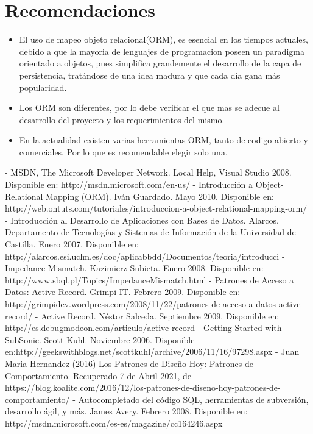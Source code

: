 \documentclass[twoside,twocolumn]{article}
\begin{document}
\section{Recomendaciones}
 \begin{itemize}
\item El uso de mapeo objeto relacional(ORM), es esencial en los tiempos actuales, debido a que la mayoria de lenguajes de programacion poseen un paradigma orientado a objetos, pues simplifica grandemente el
desarrollo de la capa de persistencia, tratándose de una idea madura y
que cada día gana más popularidad. 

\item Los ORM son diferentes, por lo debe verificar el que mas se adecue al desarrollo del proyecto y los requerimientos del mismo.

\item En la actualidad existen varias herramientas ORM, tanto de codigo abierto y comerciales. Por lo que es recomendable elegir solo una.
 \end{itemize}

\begin{thebibliography}{XXX0000}
	\bibitem - MSDN, The Microsoft Developer Network. Local Help, Visual Studio 2008. Disponible en: http://msdn.microsoft.com/en-us/
	\bibitem - Introducción a Object-Relational Mapping (ORM). Iván Guardado. Mayo 2010. Disponible en: http://web.ontuts.com/tutoriales/introduccion-a-object-relational-mapping-orm/
	\bibitem - Introducción al Desarrollo de Aplicaciones con Bases de Datos. Alarcos. Departamento de Tecnologías y Sistemas de Información de la Universidad de Castilla. Enero 2007. Disponible en: http://alarcos.esi.uclm.es/doc/aplicabbdd/Documentos/teoria/introducci%
	\bibitem - Impedance Mismatch. Kazimierz Subieta. Enero 2008. Disponible en: http://www.sbql.pl/Topics/ImpedanceMismatch.html
	\bibitem - Patrones de Acceso a Datos: Active Record. Grimpi IT. Febrero 2009. Disponible en: http://grimpidev.wordpress.com/2008/11/22/patrones-de-acceso-a-datos-active-record/
	\bibitem - Active Record. Néstor Salceda. Septiembre 2009. Disponible en: http://es.debugmodeon.com/articulo/active-record
	\bibitem - Getting Started with SubSonic. Scott Kuhl. Noviembre 2006. Disponible en:http://geekswithblogs.net/scottkuhl/archive/2006/11/16/97298.aspx
	\bibitem - Juan Maria Hernandez (2016) Los Patrones de Diseño Hoy: Patrones de Comportamiento. Recuperado 7 de Abril 2021, de https://blog.koalite.com/2016/12/los-patrones-de-diseno-hoy-patrones-de-comportamiento/
	\bibitem - Autocompletado del código SQL, herramientas de subversión, desarrollo ágil, y más. James Avery. Febrero 2008. Disponible en: http://msdn.microsoft.com/es-es/magazine/cc164246.aspx
	\end{thebibliography}

\end{document}
